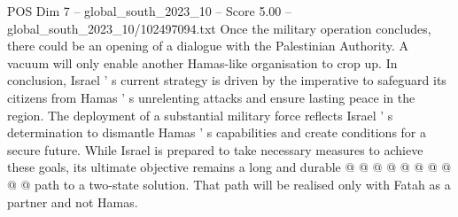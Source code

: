 \begin{textsample}{POS Dim 7 – global\_south\_2023\_10 – Score 5.00 – global\_south\_2023\_10/102497094.txt}
Once the military operation concludes, there could be an opening of a dialogue with the Palestinian Authority.
A vacuum will only enable another Hamas-like organisation to crop up.
In conclusion, Israel ' s current strategy is driven by the imperative to safeguard its citizens from Hamas ' s unrelenting attacks and ensure lasting peace in the region.
The deployment of a substantial military force reflects Israel ' s determination to dismantle Hamas ' s capabilities and create conditions for a secure future.
While Israel is prepared to take necessary measures to achieve these goals, its ultimate objective remains a long and durable @ @ @ @ @ @ @ @ @ @ path to a two-state solution.
That path will be realised only with Fatah as a partner and not Hamas.

\end{textsample}
